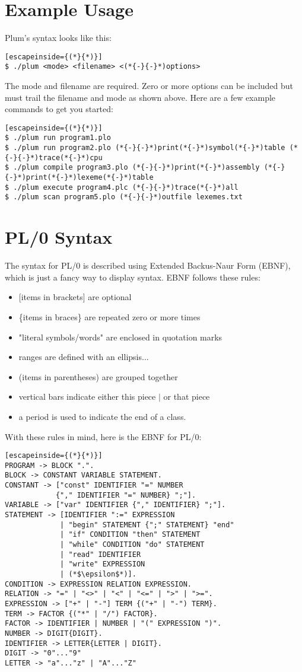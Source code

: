 \documentclass[12pt]{memoir}
\begin{document}
\section*{Example Usage}
Plum's syntax looks like this:
\begin{lstlisting}[escapeinside={(*}{*)}]
$ ./plum <mode> <filename> <(*{-}{-}*)options>
\end{lstlisting}
The mode and filename are required. Zero or more options can be included but must trail
the filename and mode as shown above. Here are a few example commands to get you started:
\begin{lstlisting}[escapeinside={(*}{*)}]
$ ./plum run program1.plo
$ ./plum run program2.plo (*{-}{-}*)print(*{-}*)symbol(*{-}*)table (*{-}{-}*)trace(*{-}*)cpu
$ ./plum compile program3.plo (*{-}{-}*)print(*{-}*)assembly (*{-}{-}*)print(*{-}*)lexeme(*{-}*)table
$ ./plum execute program4.plc (*{-}{-}*)trace(*{-}*)all
$ ./plum scan program5.plo (*{-}{-}*)outfile lexemes.txt
\end{lstlisting}

\pagebreak

\section*{PL/0 Syntax}
The syntax for PL/0 is described using Extended Backus-Naur Form (EBNF), which is just
a fancy way to display syntax. EBNF follows these rules:
\begin{itemize}
    \item {[}items in brackets{]} are optional
    \item \{items in braces\} are repeated zero or more times
    \item "literal symbols/words" are enclosed in quotation marks
    \item ranges are defined with an ellipsis...
    \item (items in parentheses) are grouped together
    \item vertical bars indicate either this piece $|$ or that piece
    \item a period is used to indicate the end of a class.
\end{itemize}
With these rules in mind, here is the EBNF for PL/0:
\begin{lstlisting}[escapeinside={(*}{*)}]
PROGRAM -> BLOCK ".".
BLOCK -> CONSTANT VARIABLE STATEMENT.
CONSTANT -> ["const" IDENTIFIER "=" NUMBER
            {"," IDENTIFIER "=" NUMBER} ";"].
VARIABLE -> ["var" IDENTIFIER {"," IDENTIFIER} ";"].
STATEMENT -> [IDENTIFIER ":=" EXPRESSION
             | "begin" STATEMENT {";" STATEMENT} "end"
             | "if" CONDITION "then" STATEMENT
             | "while" CONDITION "do" STATEMENT
             | "read" IDENTIFIER
             | "write" EXPRESSION
             | (*$\epsilon$*)].
CONDITION -> EXPRESSION RELATION EXPRESSION.
RELATION -> "=" | "<>" | "<" | "<=" | ">" | ">=".
EXPRESSION -> ["+" | "-"] TERM {("+" | "-") TERM}.
TERM -> FACTOR {("*" | "/") FACTOR}.
FACTOR -> IDENTIFIER | NUMBER | "(" EXPRESSION ")".
NUMBER -> DIGIT{DIGIT}.
IDENTIFIER -> LETTER{LETTER | DIGIT}.
DIGIT -> "0"..."9"
LETTER -> "a"..."z" | "A"..."Z"
\end{lstlisting}
\end{document}

